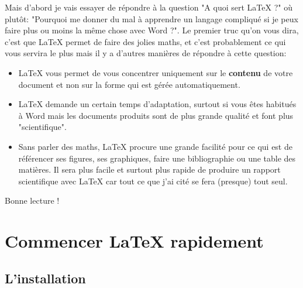 \documentclass[11pt]{article}				%
\begin{document}
Mais d'abord je vais essayer de répondre à la question "A quoi sert {\LaTeX} ?" où plutôt: "Pourquoi me donner du mal à apprendre un langage compliqué si je peux faire plus ou moins la même chose avec Word ?". Le premier truc qu'on vous dira, c'est que LaTeX permet de faire des jolies maths, et c'est probablement ce qui vous servira le plus mais il y a d'autres manières de répondre à cette question:
\begin{itemize}
	\item LaTeX vous permet de vous concentrer uniquement sur le \textbf{contenu} de votre document et non sur la forme qui est gérée automatiquement.
	\item LaTeX demande un certain temps d'adaptation, surtout si vous êtes habitués à Word mais les documents produits sont de plus grande qualité et font plus "scientifique".
	\item Sans parler des maths, LaTeX procure une grande facilité pour ce qui est de référencer ses figures, ses graphiques, faire une bibliographie ou une table des matières. Il sera plus facile et surtout plus rapide de produire un rapport scientifique avec LaTeX car tout ce que j'ai cité se fera (presque) tout seul.
\end{itemize}  

Bonne lecture !
    
\clearpage


\section*{Commencer {\LaTeX} rapidement}

\subsection*{L'installation}
\end{document}

